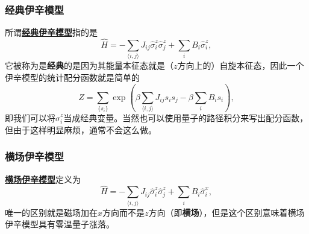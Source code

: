 \documentclass[hyperref, UTF8, a4paper]{ctexart}
\newcommand*{\pair}[1]{\langle #1 \rangle}
\renewcommand{\emph}[1]{\textbf{#1}}
\newcommand*{\concept}[1]{\underline{\textbf{#1}}}
\begin{document}
\subsubsection{经典伊辛模型}

所谓\concept{经典伊辛模型}指的是
\begin{equation}
    \hat{H} = - \sum_{\pair{i, j}} J_{ij} \hat{\sigma}_i^z \hat{\sigma}_j^z + \sum_{i} B_i \hat{\sigma}_i^z,
\end{equation}
它被称为是\emph{经典}的是因为其能量本征态就是（$z$方向上的）自旋本征态，因此一个伊辛模型的统计配分函数就是简单的
\begin{equation}
    Z = \sum_{\{s_i\}} \exp(\beta \sum_{\pair{i, j}} J_{ij} s_i s_j - \beta \sum_i B_i s_i),
\end{equation}
即我们可以将$\hat{\sigma}_i^z$当成经典变量。当然也可以使用量子的路径积分来写出配分函数，但由于这样明显麻烦，通常不会这么做。

\subsubsection{横场伊辛模型}

\concept{横场伊辛模型}定义为
\begin{equation}
    \hat{H} = - \sum_{\pair{i, j}} J_{ij} \hat{\sigma}_i^z \hat{\sigma}_j^z + \sum_{i} B_i \hat{\sigma}_i^x,
\end{equation}
唯一的区别就是磁场加在$x$方向而不是$z$方向（即\emph{横场}），但是这个区别意味着横场伊辛模型具有零温量子涨落。
\end{document}
